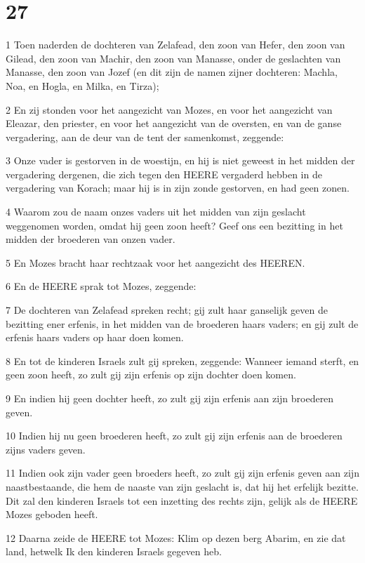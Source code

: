\chapter{27}

\par 1 Toen naderden de dochteren van Zelafead, den zoon van Hefer, den zoon van Gilead, den zoon van Machir, den zoon van Manasse, onder de geslachten van Manasse, den zoon van Jozef (en dit zijn de namen zijner dochteren: Machla, Noa, en Hogla, en Milka, en Tirza);
\par 2 En zij stonden voor het aangezicht van Mozes, en voor het aangezicht van Eleazar, den priester, en voor het aangezicht van de oversten, en van de ganse vergadering, aan de deur van de tent der samenkomst, zeggende:
\par 3 Onze vader is gestorven in de woestijn, en hij is niet geweest in het midden der vergadering dergenen, die zich tegen den HEERE vergaderd hebben in de vergadering van Korach; maar hij is in zijn zonde gestorven, en had geen zonen.
\par 4 Waarom zou de naam onzes vaders uit het midden van zijn geslacht weggenomen worden, omdat hij geen zoon heeft? Geef ons een bezitting in het midden der broederen van onzen vader.
\par 5 En Mozes bracht haar rechtzaak voor het aangezicht des HEEREN.
\par 6 En de HEERE sprak tot Mozes, zeggende:
\par 7 De dochteren van Zelafead spreken recht; gij zult haar ganselijk geven de bezitting ener erfenis, in het midden van de broederen haars vaders; en gij zult de erfenis haars vaders op haar doen komen.
\par 8 En tot de kinderen Israels zult gij spreken, zeggende: Wanneer iemand sterft, en geen zoon heeft, zo zult gij zijn erfenis op zijn dochter doen komen.
\par 9 En indien hij geen dochter heeft, zo zult gij zijn erfenis aan zijn broederen geven.
\par 10 Indien hij nu geen broederen heeft, zo zult gij zijn erfenis aan de broederen zijns vaders geven.
\par 11 Indien ook zijn vader geen broeders heeft, zo zult gij zijn erfenis geven aan zijn naastbestaande, die hem de naaste van zijn geslacht is, dat hij het erfelijk bezitte. Dit zal den kinderen Israels tot een inzetting des rechts zijn, gelijk als de HEERE Mozes geboden heeft.
\par 12 Daarna zeide de HEERE tot Mozes: Klim op dezen berg Abarim, en zie dat land, hetwelk Ik den kinderen Israels gegeven heb.
